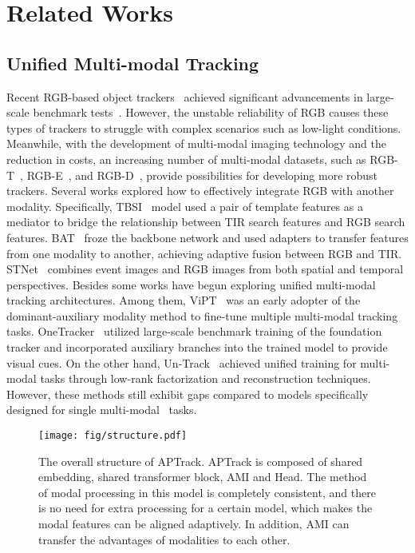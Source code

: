 \section{Related Works}
\subsection{Unified Multi-modal Tracking}
Recent RGB-based object trackers~\cite{simtrack,mixformer,ostrack,stark,transt} achieved significant advancements in large-scale benchmark tests~\cite{lasot,got10k,trackingnet}. However, the unstable reliability of RGB causes these types of trackers to struggle with complex scenarios such as low-light conditions. Meanwhile, with the development of multi-modal imaging technology and the reduction in costs, an increasing number of multi-modal datasets, such as RGB-T~\cite{lasher,rgbt234}, RGB-E~\cite{visevent}, and RGB-D~\cite{depthtrack,vot-rgbd}, provide possibilities for developing more robust trackers. 
Several works explored how to effectively integrate RGB with another modality. Specifically, TBSI~\cite{tbsi} model used a pair of template features as a mediator to bridge the relationship between TIR search features and RGB search features. BAT~\cite{bat} froze the backbone network and used adapters to transfer features from one modality to another, achieving adaptive fusion between RGB and TIR. STNet~\cite{stnet} combines event images and RGB images from both spatial and temporal perspectives. 
Besides some works have begun exploring unified multi-modal tracking architectures. Among them, ViPT~\cite{vipt} was an early adopter of the dominant-auxiliary modality method to fine-tune multiple multi-modal tracking tasks. OneTracker~\cite{onetracker} utilized large-scale benchmark training of the foundation tracker and incorporated auxiliary branches into the trained model to provide visual cues. On the other hand, Un-Track~\cite{untrack} achieved unified training for multi-modal tasks through low-rank factorization and reconstruction techniques. 
However, these methods still exhibit gaps compared to models specifically designed for single multi-modal~\cite{tbsi,bat,mctrack,hu2024exploiting} tasks.

\begin{figure*}
    \centering
    \texttt{[image: fig/structure.pdf]}
    \caption{The overall structure of APTrack. APTrack is composed of shared embedding, shared transformer block, AMI and Head. The method of modal processing in this model is completely consistent, and there is no need for extra processing for a certain model, which makes the modal features can be aligned adaptively. In addition, AMI can transfer the advantages of modalities to each other.
 }
  \label{fig:struct} 
\end{figure*}


